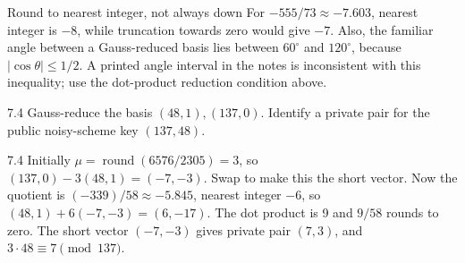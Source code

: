 \documentclass[11pt,a4paper]{article}
\begin{document}
\begin{tip}{Round to nearest integer, not always down}
For \(-555/73\approx-7.603\), nearest integer is \(-8\), while truncation towards zero would give \(-7\). Also, the familiar angle between a Gauss-reduced basis lies between \(60^\circ\) and \(120^\circ\), because \(|\cos\theta|\le1/2\). A printed angle interval in the notes is inconsistent with this inequality; use the dot-product reduction condition above.
\end{tip}
\begin{question}{7.4}
Gauss-reduce the basis \((48,1),(137,0)\). Identify a private pair for the public noisy-scheme key \((137,48)\).
\end{question}
\begin{answer}{7.4}
Initially \(\mu=\operatorname{round}(6576/2305)=3\), so \((137,0)-3(48,1)=(-7,-3)\). Swap to make this the short vector. Now the quotient is \((-339)/58\approx-5.845\), nearest integer \(-6\), so \((48,1)+6(-7,-3)=(6,-17)\). The dot product is 9 and \(9/58\) rounds to zero. The short vector \((-7,-3)\) gives private pair \((7,3)\), and \(3\cdot48\equiv7\pmod{137}\).
\end{answer}
\end{document}
